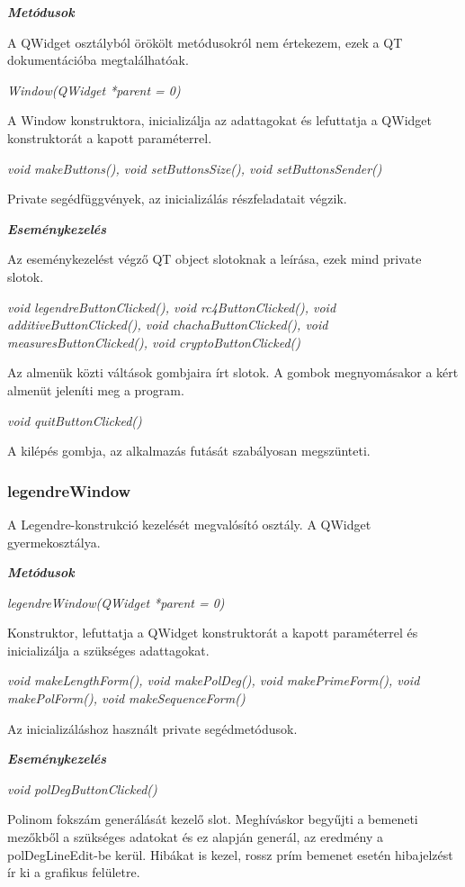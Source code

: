 \documentclass[12pt]{article}
\begin{document}
\textit{\textbf{Metódusok}}

A QWidget osztályból örökölt metódusokról nem értekezem, ezek a QT dokumentációba megtalálhatóak.

\textit{Window(QWidget *parent = 0)}

A Window konstruktora, inicializálja az adattagokat és lefuttatja a QWidget konstruktorát a kapott paraméterrel.

\textit{void makeButtons(), void setButtonsSize(), void setButtonsSender()}

Private segédfüggvények, az inicializálás részfeladatait végzik.

\textit{\textbf{Eseménykezelés}}

Az eseménykezelést végző QT object slotoknak a leírása, ezek mind private slotok.

\textit{void legendreButtonClicked(), void rc4ButtonClicked(), void additiveButtonClicked(), void chachaButtonClicked(), void measuresButtonClicked(), void cryptoButtonClicked()}

Az almenük közti váltások gombjaira írt slotok. A gombok megnyomásakor a kért almenüt jeleníti meg a program.

\textit{void quitButtonClicked()}

A kilépés gombja, az alkalmazás futását szabályosan megszünteti.

\subsubsection*{legendreWindow}

A Legendre-konstrukció kezelését megvalósító osztály. A QWidget gyermekosztálya.

\textbf{\textit{Metódusok}}

\textit{legendreWindow(QWidget *parent = 0)}

Konstruktor, lefuttatja a QWidget konstruktorát a kapott paraméterrel és inicializálja a szükséges adattagokat.

\textit{void makeLengthForm(), void makePolDeg(), void makePrimeForm(), void makePolForm(), void makeSequenceForm()}

Az inicializáláshoz használt private segédmetódusok.

\textbf{\textit{Eseménykezelés}}

\textit{void polDegButtonClicked()}

Polinom fokszám generálását kezelő slot. Meghíváskor begyűjti a bemeneti mezőkből a szükséges adatokat és ez alapján generál, az eredmény a polDegLineEdit-be kerül.
Hibákat is kezel, rossz prím bemenet esetén hibajelzést ír ki a grafikus felületre.
\end{document}

